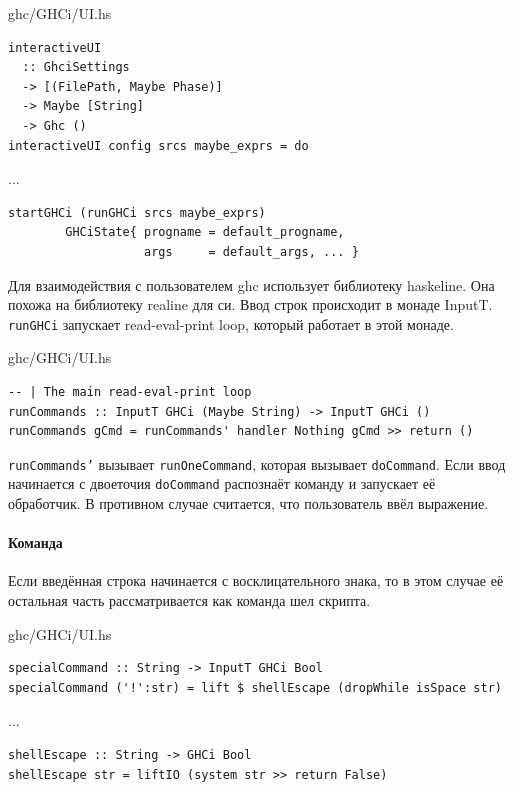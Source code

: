 \documentclass[fontsize=14pt, paper=a4, pagesize, DIV=calc]{scrartcl}
\def\code#1{\texttt{#1}}
\begin{document}
\begin{ListingEnv}
\caption{ghc/GHCi/UI.hs}
\begin{lstlisting}[firstnumber=400]
interactiveUI 
  :: GhciSettings 
  -> [(FilePath, Maybe Phase)] 
  -> Maybe [String]
  -> Ghc ()
interactiveUI config srcs maybe_exprs = do
\end{lstlisting}
...
\begin{lstlisting}[firstnumber=454]
    startGHCi (runGHCi srcs maybe_exprs)
        GHCiState{ progname = default_progname,
                   args     = default_args, ... }
\end{lstlisting}
\end{ListingEnv}

Для взаимодействия с пользователем ghc использует библиотеку haskeline. Она
похожа на библиотеку realine для си. Ввод строк происходит в монаде InputT.
\code{runGHCi} запускает read-eval-print loop, который работает в этой монаде.

\begin{ListingEnv}
\caption{ghc/GHCi/UI.hs}
\begin{lstlisting}[firstnumber=892]
-- | The main read-eval-print loop
runCommands :: InputT GHCi (Maybe String) -> InputT GHCi ()
runCommands gCmd = runCommands' handler Nothing gCmd >> return ()
\end{lstlisting}
\end{ListingEnv}

\code{runCommands'} вызывает \code{runOneCommand}, которая вызывает
\code{doCommand}. Если ввод начинается с двоеточия \code{doCommand} распознаёт
команду и запускает её обработчик. В противном случае считается, что
пользователь ввёл выражение.

\paragraph{Команда}

Если введённая строка начинается с восклицательного знака, то в этом случае её
остальная часть рассматривается как команда шел скрипта.

\begin{ListingEnv}
\caption{ghc/GHCi/UI.hs}
\begin{lstlisting}[firstnumber=1204]
specialCommand :: String -> InputT GHCi Bool
specialCommand ('!':str) = lift $ shellEscape (dropWhile isSpace str)
\end{lstlisting}
...
\begin{lstlisting}[firstnumber=1221]
shellEscape :: String -> GHCi Bool
shellEscape str = liftIO (system str >> return False)
\end{lstlisting}
\end{ListingEnv}
\end{document}
